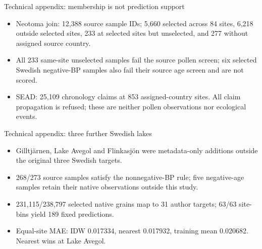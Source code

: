 \begin{frame}{Technical appendix: membership is not prediction support}
\small
\begin{itemize}
\item Neotoma join: 12,388 source sample IDs; 5,660 selected across 84 sites, 6,218 outside selected sites, 233 at selected sites but unselected, and 277 without assigned source country.
\item All 233 same-site unselected samples fail the source pollen screen; six selected Swedish negative-BP samples also fail their source age screen and are not scored.
\item SEAD: 25,109 chronology claims at 853 assigned-country sites. All claim propagation is refused; these are neither pollen observations nor ecological events.
\end{itemize}
\end{frame}

\begin{frame}{Technical appendix: three further Swedish lakes}
\small
\begin{itemize}
\item Gilltj\"arnen, Lake Avegol and Flinkasj\"on were metadata-only additions outside the original three Swedish targets.
\item 268/273 source samples satisfy the nonnegative-BP rule; five negative-age samples retain their native observations outside this study.
\item 231,115/238,797 selected native grains map to 31 author targets; 63/63 site-bins yield 189 fixed predictions.
\item Equal-site MAE: IDW 0.017334, nearest 0.017932, training mean 0.020682. Nearest wins at Lake Avegol.
\end{itemize}
\end{frame}

